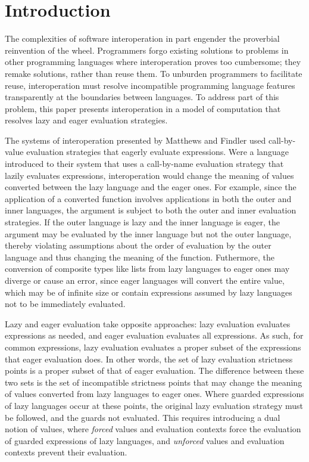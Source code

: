 \section{Introduction}

The complexities of software interoperation in part engender the proverbial reinvention of the wheel. Programmers forgo existing solutions to problems in other programming languages where interoperation proves too cumbersome; they remake solutions, rather than reuse them. To unburden programmers to facilitate reuse, interoperation must resolve incompatible programming language features transparently at the boundaries between languages. To address part of this problem, this paper presents interoperation in a model of computation that resolves lazy and eager evaluation strategies.

The systems of interoperation presented by Matthews and Findler \cite{matthews07} used call-by-value evaluation strategies that eagerly evaluate expressions. Were a language introduced to their system that uses a call-by-name evaluation strategy that lazily evaluates expressions, interoperation would change the meaning of values converted between the lazy language and the eager ones. For example, since the application of a converted function involves applications in both the outer and inner languages, the argument is subject to both the outer and inner evaluation strategies. If the outer language is lazy and the inner language is eager, the argument may be evaluated by the inner language but not the outer language, thereby violating assumptions about the order of evaluation by the outer language and thus changing the meaning of the function. Futhermore, the conversion of composite types like lists from lazy languages to eager ones may diverge or cause an error, since eager languages will convert the entire value, which may be of infinite size or contain expressions assumed by lazy languages not to be immediately evaluated.

Lazy and eager evaluation take opposite approaches: lazy evaluation evaluates expressions as needed, and eager evaluation evaluates all expressions. As such, for common expressions, lazy evaluation evaluates a proper subset of the expressions that eager evaluation does. In other words, the set of lazy evaluation strictness points is a proper subset of that of eager evaluation. The difference between these two sets is the set of incompatible strictness points that may change the meaning of values converted from lazy languages to eager ones. Where guarded expressions of lazy languages occur at these points, the original lazy evaluation strategy must be followed, and the guards not evaluated. This requires introducing a dual notion of values, where \emph{forced} values and evaluation contexts force the evaluation of guarded expressions of lazy languages, and \emph{unforced} values and evaluation contexts prevent their evaluation.